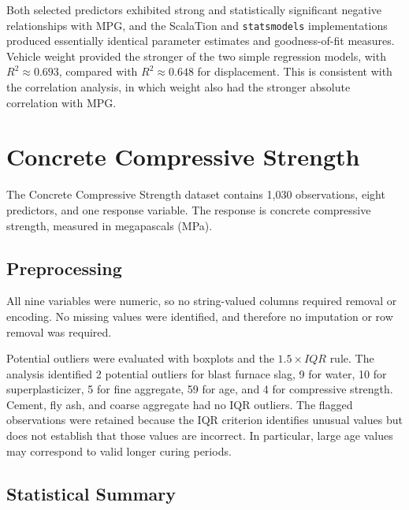 \documentclass[11pt]{article}
\begin{document}
Both selected predictors exhibited strong and statistically significant
negative relationships with MPG, and the ScalaTion and \texttt{statsmodels}
implementations produced essentially identical parameter estimates and
goodness-of-fit measures. Vehicle weight provided the stronger of the two
simple regression models, with $R^2\approx0.693$, compared with
$R^2\approx0.648$ for displacement. This is consistent with the correlation
analysis, in which weight also had the stronger absolute correlation with MPG.

\newpage
\section{Concrete Compressive Strength}

The Concrete Compressive Strength dataset contains 1,030 observations, eight
predictors, and one response variable. The response is concrete compressive
strength, measured in megapascals (MPa).

\subsection{Preprocessing}

All nine variables were numeric, so no string-valued columns required removal
or encoding. No missing values were identified, and therefore no imputation or
row removal was required.

Potential outliers were evaluated with boxplots and the $1.5\times IQR$ rule.
The analysis identified 2 potential outliers for blast furnace slag, 9 for
water, 10 for superplasticizer, 5 for fine aggregate, 59 for age, and 4 for
compressive strength. Cement, fly ash, and coarse aggregate had no IQR
outliers. The flagged observations were retained because the IQR criterion
identifies unusual values but does not establish that those values are
incorrect. In particular, large age values may correspond to valid longer
curing periods.

\subsection{Statistical Summary}
\end{document}
